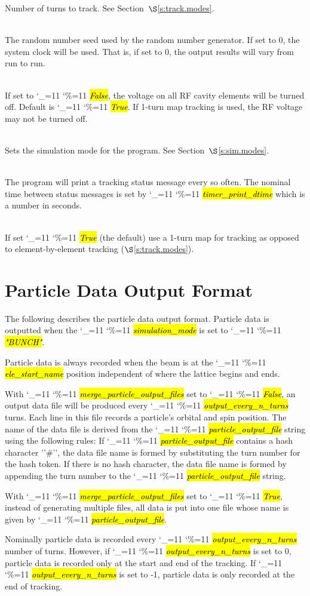 \documentclass{hitec}
\newcommand\dottcmd[1]{\hl{\em#1}\endgroup}
\newcommand{\vn}{\begingroup\catcode`\_=11 \catcode`\%=11 \dottcmd}
\newcommand{\Newline}{\hfil \\}
\newcommand{\sref}[1]{$\S$\ref{#1}}
\newcommand{\Section}[1]{\section{#1}\vspace*{-1ex}}
\begin{document}
{{{{{{\begin{description}
Number of turns to track. See Section~\sref{s:track.modes}.
%
\item[random_seed] \Newline
The random number seed used by the random number generator. If set to 0, the
system clock will be used. That is, if set to 0, the output results will vary from run to run.
%
\item[rfcavity_on] \Newline
If set to \vn{False}, the voltage on all RF cavity elements will be turned off. Default is \vn{True}.
If 1-turn map tracking is used, the RF voltage may not be turned off.
%
\item[simulation_mode] \Newline
Sets the simulation mode for the program. See Section~\sref{s:sim.modes}.
%
\item[timer_print_dtime] \Newline
The program will print a tracking status message every so often. The nominal time between status
messages is set by \vn{timer_print_dtime} which is a number in seconds.
%
\item[use_1_turn_map] \Newline
If set \vn{True} (the default) use a 1-turn map for tracking as opposed to element-by-element
tracking (\sref{s:track.modes}).
\end{description}

\Section{Particle Data Output Format}
\label{s:part.out}

The following describes the particle data output format. Particle data is outputted when the
\vn{simulation_mode} is set to \vn{"BUNCH"}.

Particle data is always recorded when the beam is at the \vn{ele_start_name} position independent of
where the lattice begins and ends.

With \vn{merge_particle_output_files} set to \vn{False}, an output data file will be produced every
\vn{output_every_n_turns} turns. Each line in this file records a particle's orbital and
spin position. The name of the data file is derived from the \vn{particle_output_file} string using
the following rules: If \vn{particle_output_file} contains a hash character ''\#'', the data file name
is formed by substituting the turn number for the hash token. If there is no hash character, the
data file name is formed by appending the turn number to the \vn{particle_output_file} string.

With \vn{merge_particle_output_files} set to \vn{True}, instead of generating multiple files, all data is
put into one file whose name is given by \vn{particle_output_file}.

Nominally particle data is recorded every \vn{output_every_n_turns} number of
turns. However, if \vn{output_every_n_turns} is set to 0, particle data is recorded only
at the start and end of the tracking. If \vn{output_every_n_turns} is set to -1,
particle data is only recorded at the end of tracking.

}}}}}}
\end{document}

